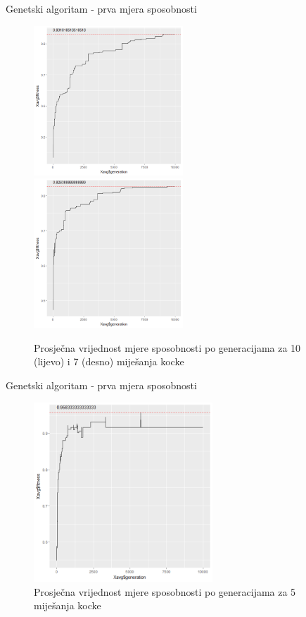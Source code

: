 \documentclass{beamer}
\begin{document}
  \begin{frame}{Genetski algoritam - prva mjera sposobnosti}
  		\begin{figure}[h]
			\centering
			\includegraphics[width=0.5\textwidth]{../../results/sumsides_fitness/10_scrambles/cross0,5greedy10mut20.png}
			\includegraphics[width=0.5\textwidth]{../../results/sumsides_fitness/7_scrambles/cross0,5greedy10mut20.png}
			\caption{Prosječna vrijednost mjere sposobnosti po generacijama za 10 (lijevo) i 7 (desno) miješanja kocke }
		\end{figure}
  \end{frame}  
    
  \begin{frame}{Genetski algoritam - prva mjera sposobnosti}
  		\begin{figure}[h]
			\centering
			\includegraphics[width=0.6\textwidth]{../../results/sumsides_fitness/5_scrambles/cross0,5greedy10mut20.png}
			\caption{Prosječna vrijednost mjere sposobnosti po generacijama za 5 miješanja kocke }
		\end{figure}
  \end{frame}  
    
\end{document}
